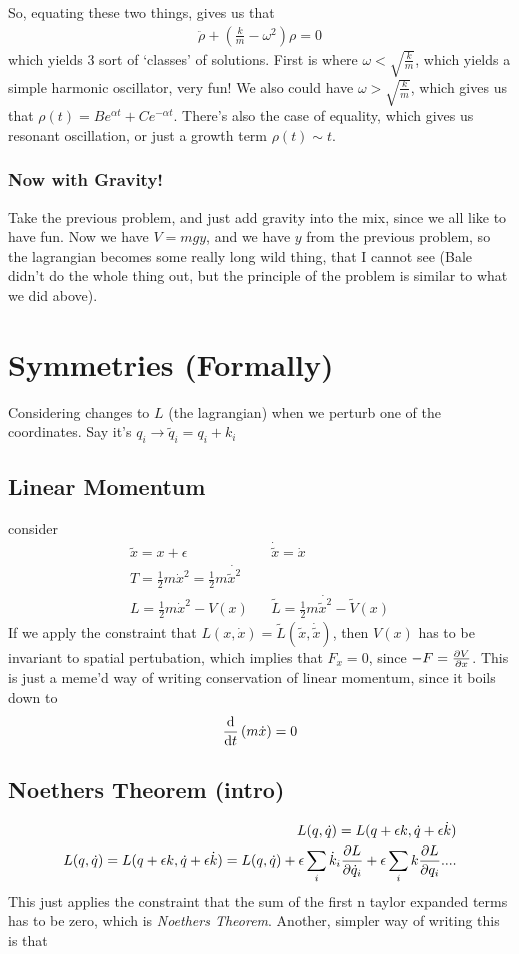 \documentclass{article} \usepackage{amsmath} \usepackage{amssymb} \usepackage{amsthm} \usepackage[margin=0.2in]{geometry} \usepackage{hyperref} \usepackage{physics} \usepackage{tikz} \usepackage{mathtools} \mathtoolsset{showonlyrefs} \theoremstyle{definition} \newtheorem{theorem}{Theorem}[section] \newtheorem{corollary}{Corollary}[theorem] \newtheorem{lemma}[theorem]{Lemma} \newtheorem{definition}{Definition}[section] \author{Connor Duncan} \date{\today}
\begin{document}
So, equating these two things, gives us that \begin{align} \ddot\rho+(\frac{k}{m}-\omega^2)\rho=0 \end{align} which yields 3 sort of `classes' of solutions. First is where $\omega<\sqrt{\frac{k}{m}}$, which yields a simple harmonic oscillator, very fun! We also could have $\omega>\sqrt{\frac{k}{m}}$, which gives us that $\rho(t)=Be^{\alpha t}+Ce^{-\alpha t}$. There's also the case of equality, which gives us resonant oscillation, or just a growth term $\rho(t)\sim t$. \subsubsection{Now with Gravity!} Take the previous problem, and just add gravity into the mix, since we all like to have fun. Now we have $V=mgy$, and we have $y$ from the previous problem, so the lagrangian becomes some really long wild thing, that I cannot see (Bale didn't do the whole thing out, but the principle of the problem is similar to what we did above). \section{Symmetries (Formally)} Considering changes to $L$ (the lagrangian) when we perturb one of the coordinates. Say it's $q_i\rightarrow \tilde q_i=q_i+k_i$ \subsection{Linear Momentum} consider \begin{align} \tilde x =x+\epsilon && \dot{\tilde x}=\dot x\\ T=\frac{1}{2}m\dot x^2=\frac{1}{2}m\dot{\tilde{x}^2}\\ L=\frac{1}{2}m\dot x^2-V(x) && \tilde L=\frac{1}{2}m\dot{\tilde{x}^2}-\tilde V(x) \end{align} If we apply the constraint that $L(x,\dot x)=\tilde L(\tilde x,\dot{\tilde x})$, then $V(x)$ has to be invariant to spatial pertubation, which implies that $F_x=0$, since $-F=\pdv{V}{x}$. This is just a meme'd way of writing conservation of linear momentum, since it boils down to \begin{equation} \dv{}{t} \left(m\dot x\right)=0 \end{equation} \subsection{Noethers Theorem (intro)} \begin{align} L(q,\dot q)=L(q+\epsilon k,\dot q+\epsilon\dot k)\\ L(q,\dot q)=L(q+\epsilon k,\dot q+\epsilon\dot k)=L(q,\dot q)+\epsilon\sum_i\dot k_i\pdv{L}{\dot q_i}+\epsilon\sum_ik\pdv{L}{q_i}....\\ \end{align} This just applies the constraint that the sum of the first n taylor expanded terms has to be zero, which is \emph{Noethers Theorem}. Another, simpler way of writing this is that 
\end{document}
